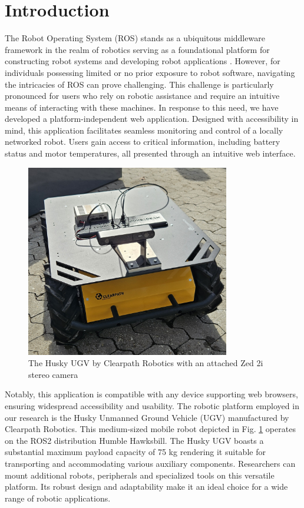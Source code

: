 \documentclass[conference]{IEEEtran}
\begin{document}
\section{Introduction}
The Robot Operating System (ROS) stands as a ubiquitous middleware framework in the realm of robotics serving as a foundational platform for constructing robot systems and developing robot applications \cite{rosOrg}. 
However, for individuals possessing limited or no prior exposure to robot software, navigating the intricacies of ROS can prove challenging. 
This challenge is particularly pronounced for users who rely on robotic assistance and require an intuitive means of interacting with these machines.
In response to this need, we have developed a platform-independent web application. 
Designed with accessibility in mind, this application facilitates seamless monitoring and control of a locally networked robot. Users gain access to critical information, including battery status and motor temperatures, all presented through an intuitive web interface. 
\begin{figure}[htp]
    \centerline{\includegraphics[width=8.9cm]{Pictures/huskyzed2.jpg}}
    \caption{The Husky UGV by Clearpath Robotics with an attached Zed 2i stereo camera}
    \label{fig:huskyClearpath}
\end{figure}
Notably, this application is compatible with any device supporting web browsers, ensuring widespread accessibility and usability.
The robotic platform employed in our research is the Husky Unmanned Ground Vehicle (UGV) manufactured by Clearpath Robotics. This medium-sized mobile robot depicted in Fig. \ref{fig:huskyClearpath} operates on the ROS2 distribution Humble Hawksbill.
The Husky UGV boasts a substantial maximum payload capacity of 75 kg rendering it suitable for transporting and accommodating various auxiliary components. Researchers can mount additional robots, peripherals and specialized tools on this versatile platform. Its robust design and adaptability make it an ideal choice for a wide range of robotic applications\cite{huskyClearpath}. 
\end{document}
